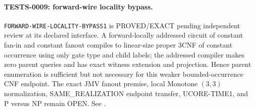 \paragraph{TESTS-0009: forward-wire locality bypass.}
\texttt{FORWARD-WIRE-LOCALITY-BYPASS1} is PROVED/EXACT pending independent
review at its declared interface.  A forward-locally addressed circuit of
constant fan-in and constant fanout compiles to linear-size proper 3CNF of
constant occurrence using only gate type and child labels; the addressed
compiler makes zero parent queries and has exact witness extension and
projection.  Hence parent enumeration is sufficient but not necessary for
this weaker bounded-occurrence CNF endpoint.  The exact JMV fanout premise,
local Monotone $(3,3)$ normalization, SAME\_REALIZATION endpoint transfer,
UCORE-TIME1, and P versus NP remain OPEN.  See
.

